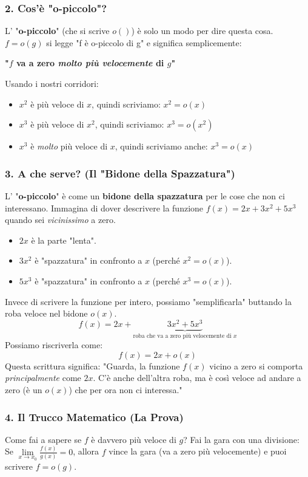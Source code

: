 \subsubsection{2. Cos'è "o-piccolo"?}
L' "\textbf{o-piccolo}" (che si scrive $o()$) è solo un modo per dire questa cosa.
$f = o(g)$ si legge "f è o-piccolo di g" e significa semplicemente:
\begin{center}
    \textbf{"$f$ va a zero \textit{molto più velocemente} di $g$"}
\end{center}
Usando i nostri corridori:
\begin{itemize}
    \item $x^2$ è più veloce di $x$, quindi scriviamo: $x^2 = o(x)$
    \item $x^3$ è più veloce di $x^2$, quindi scriviamo: $x^3 = o(x^2)$
    \item $x^3$ è \textit{molto} più veloce di $x$, quindi scriviamo anche: $x^3 = o(x)$
\end{itemize}

\subsubsection{3. A che serve? (Il "Bidone della Spazzatura")}
L' "\textbf{o-piccolo}" è come un \textbf{bidone della spazzatura} per le cose che non ci interessano.
Immagina di dover descrivere la funzione $f(x) = 2x + 3x^2 + 5x^3$ quando sei \textit{vicinissimo} a zero.
\begin{itemize}
    \item $2x$ è la parte "lenta".
    \item $3x^2$ è "spazzatura" in confronto a $x$ (perché $x^2 = o(x)$).
    \item $5x^3$ è "spazzatura" in confronto a $x$ (perché $x^3 = o(x)$).
\end{itemize}
Invece di scrivere la funzione per intero, possiamo "semplificarla" buttando la roba veloce nel bidone $o(x)$.
$$ f(x) = 2x + \underbrace{3x^2 + 5x^3}_{\text{roba che va a zero più velocemente di } x} $$
Possiamo riscriverla come:
$$ f(x) = 2x + o(x) $$
Questa scrittura significa: "Guarda, la funzione $f(x)$ vicino a zero si comporta \textit{principalmente} come $2x$. C'è anche dell'altra roba, ma è così veloce ad andare a zero (è un $o(x)$) che per ora non ci interessa."

\subsubsection{4. Il Trucco Matematico (La Prova)}
Come fai a sapere se $f$ è davvero più veloce di $g$?
Fai la gara con una divisione:
Se $\lim\limits_{x \to x_0} \frac{f(x)}{g(x)} = 0$, allora $f$ vince la gara (va a zero più velocemente) e puoi scrivere $f = o(g)$.

